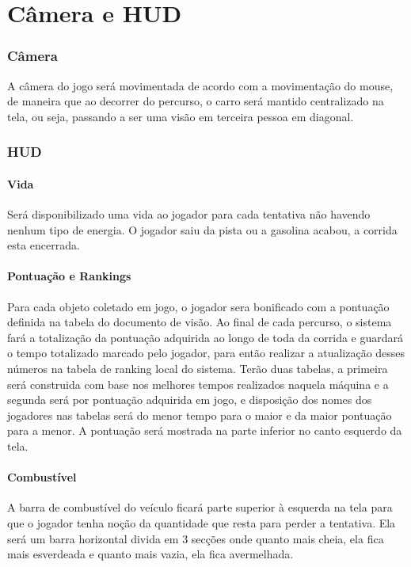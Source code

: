 \part{Câmera e HUD}

\section{Câmera}

    A câmera do jogo será movimentada de acordo com a movimentação do mouse, de maneira que ao decorrer do percurso, o carro será mantido centralizado na tela, ou seja, passando a ser uma visão em terceira pessoa em diagonal.

\section{HUD}

    \subsection{Vida}

        Será disponibilizado uma vida ao jogador para cada tentativa não havendo nenhum tipo de energia. O jogador saiu da pista ou a gasolina acabou, a corrida esta encerrada.

    \subsection{Pontuação e Rankings}

        Para cada objeto coletado em jogo, o jogador sera bonificado com a pontuação definida na tabela do documento de visão. Ao final de cada percurso, o sistema fará a totalização da pontuação adquirida ao longo de toda da corrida e guardará o tempo totalizado marcado pelo jogador, para então realizar a atualização desses números na tabela de ranking local do sistema. Terão duas tabelas, a primeira será construida com base nos melhores tempos realizados naquela máquina e a segunda será por pontuação adquirida em jogo, e disposição dos nomes dos jogadores nas tabelas será do menor tempo para o maior e da maior pontuação para a menor. A pontuação será mostrada na parte inferior no canto esquerdo da tela.
        
    \subsection{Combustível}

        A barra de combustível do veículo ficará parte superior à esquerda na tela para que o jogador tenha noção da quantidade que resta para perder a tentativa. Ela será um barra horizontal divida em 3 secções onde quanto mais cheia, ela fica mais esverdeada e quanto mais vazia, ela fica avermelhada.

